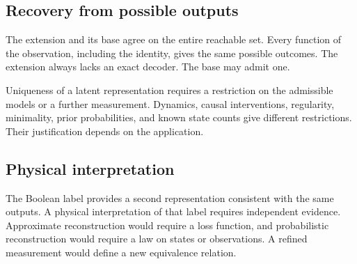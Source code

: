 \subsection{Recovery from possible outputs}

The extension and its base agree on the entire reachable set. Every function of the observation, including the identity, gives the same possible outcomes. The extension always lacks an exact decoder. The base may admit one.

Uniqueness of a latent representation requires a restriction on the admissible models or a further measurement. Dynamics, causal interventions, regularity, minimality, prior probabilities, and known state counts give different restrictions. Their justification depends on the application.

\subsection{Physical interpretation}

The Boolean label provides a second representation consistent with the same outputs. A physical interpretation of that label requires independent evidence. Approximate reconstruction would require a loss function, and probabilistic reconstruction would require a law on states or observations. A refined measurement would define a new equivalence relation.
